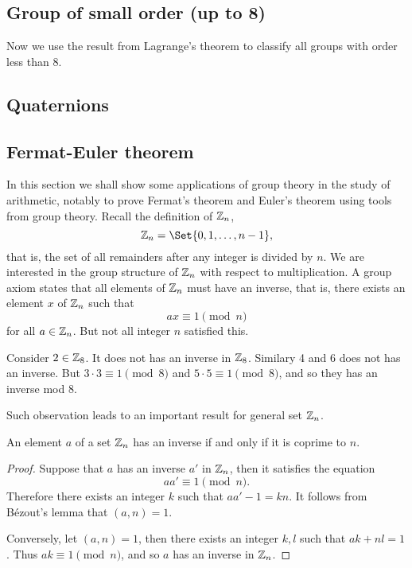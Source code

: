 \documentclass[main.tex]{subfiles}
\begin{document}
			\subsection{Group of small order (up to 8)}
				Now we use the result from Lagrange's theorem to classify all groups with order less than 8.
			\subsection{Quaternions}
			
			\subsection{Fermat-Euler theorem}
			In this section we shall show some applications of group theory in the study of arithmetic, notably to prove Fermat's theorem and Euler's theorem using tools from group theory. Recall the definition of $\mathbb Z_n$,
			\begin{equation*}
				\ZZ_n = \Set{0, 1, \ldots, n - 1},
			\end{equation*}
			that is, the set of all remainders after any integer is divided by $n$. We are interested in the group structure of $\mathbb Z_n$ with respect to multiplication. A group axiom states that all elements of $\mathbb Z_n$ must have an inverse, that is, there exists an element $x$ of $\mathbb Z_n$ such that
			\begin{equation*}
				ax \equiv 1	\pmod n
			\end{equation*} 
			for all $a \in \mathbb Z_n$. But not all integer $n$ satisfied this. 
			\begin{example}
				Consider $2 \in \mathbb Z_8$. It does not has an inverse in $\mathbb Z_8$. Similary 4 and 6 does not has an inverse. But $3\cdot 3 \equiv 1 \pmod 8$ and $5 \cdot 5 \equiv 1 \pmod 8$, and so they has an inverse mod 8.
			\end{example} 
			Such observation leads to an important result for general set $\mathbb Z_n$.
			\begin{theorem}
				An element $a$ of a set $\mathbb Z_n$ has an inverse if and only if it is coprime to $n$.
			\end{theorem}
			\begin{proof}
				Suppose that $a$ has an inverse $a'$ in $\mathbb Z_n$, then it satisfies the equation
				\begin{equation*}
					aa' \equiv 1 \pmod {n} .
				\end{equation*}
				Therefore there exists an integer $k$ such that $aa' - 1 = kn$. It follows from B\'ezout's lemma that $(a, n) = 1$.
				
				Conversely, let $(a, n) = 1$, then there exists an integer $k, l$ such that $ak + nl = 1$. Thus $ak \equiv 1 \pmod n$, and so $a$ has an inverse in $\mathbb Z_n$.
			\end{proof}
\end{document}
